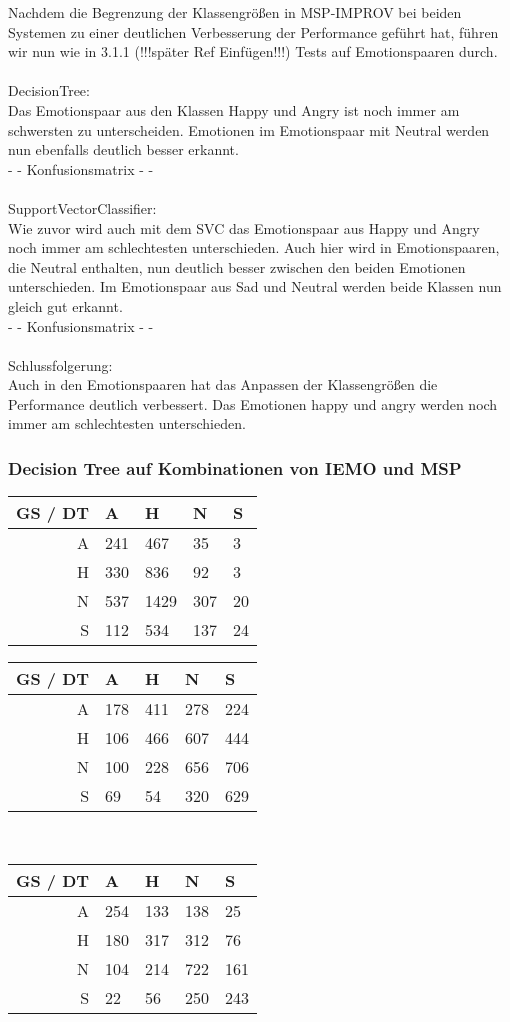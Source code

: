 \documentclass{article} %
\begin{document}
Nachdem die Begrenzung der Klassengrößen in MSP-IMPROV bei beiden Systemen zu einer deutlichen Verbesserung der Performance geführt hat, führen wir nun wie in 3.1.1 (!!!später Ref Einfügen!!!) Tests auf Emotionspaaren durch. \\ \\
DecisionTree: \\
Das Emotionspaar aus den Klassen Happy und Angry ist noch immer am schwersten zu unterscheiden. Emotionen im Emotionspaar mit Neutral werden nun ebenfalls deutlich besser erkannt. \\
- - Konfusionsmatrix - - \\ \\
SupportVectorClassifier: \\
Wie zuvor wird auch mit dem SVC das Emotionspaar aus Happy und Angry noch immer am schlechtesten unterschieden. Auch hier wird in Emotionspaaren, die Neutral enthalten, nun deutlich besser zwischen den beiden Emotionen unterschieden. Im Emotionspaar aus Sad und Neutral werden beide Klassen nun gleich gut erkannt. \\
- - Konfusionsmatrix - - \\ \\
Schlussfolgerung: \\
Auch in den Emotionspaaren hat das Anpassen der Klassengrößen die Performance deutlich verbessert. Das Emotionen happy und angry werden noch immer am schlechtesten unterschieden. \\

\subsubsection{Decision Tree auf Kombinationen von IEMO und MSP}
\begin{tabular}{|r|llll|}
\hline
GS / DT & A & H & N & S \\
\hline
A & 241 & 467 & 35 & 3 \\
H & 330 & 836 & 92 & 3 \\
N & 537 & 1429 & 307 & 20 \\
S & 112 & 534 & 137 & 24 \\
\hline
\end{tabular}
\begin{tabular}{|r|llll|}
\hline
GS / DT & A & H & N & S \\
\hline
A & 178 & 411 & 278 & 224 \\
H & 106 & 466 & 607 & 444 \\
N & 100 & 228 & 656 & 706 \\
S & 69 & 54 & 320 & 629 \\
\hline
\end{tabular} \\
\begin{tabular}{|r|llll|}
\hline
GS / DT & A & H & N & S \\
\hline
A & 254 & 133 & 138 & 25 \\
H & 180 & 317 & 312 & 76 \\
N & 104 & 214 & 722 & 161 \\
S & 22 & 56 & 250 & 243 \\
\hline
\end{tabular} \\
\end{document}

